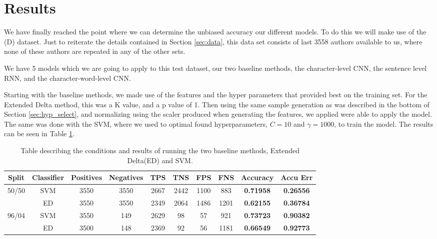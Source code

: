 \section{Results} \label{sec:results}

We have finally reached the point where we can determine the unbiased accuracy
our different models. To do this we will make use of the (D) dataset. Just
to reiterate the details contained in Section \ref{sec:data}, this data set
consists of last 3558 authors available to us, where none of these authors are
repeated in any of the other sets.

We have 5 models which we are going to apply to this test dataset,
our two baseline methods, the character-level \gls{CNN}, the sentence
level RNN, and the character-word-level \gls{CNN}.

Starting with the baseline methods, we made use of the features and the
hyper parameters that provided best on the training set.
For the Extended Delta method, this was a K value, and a p value of 1.
Then using the same sample generation as was described in the bottom
of Section \ref{sec:hyp_select}, and normalizing using the scaler
produced when generating the features, we applied were able to apply the model.
The same was done with the SVM, where we used to optimal found hyperparameters,
$C=10$ and $\gamma = 1000$, to train the model. The results can be seen in Table
\ref{tab:baseline-res}.

\begin{table}[h]
\centering
\begin{tabular}{|c|c|c|c|c|c|c|c||c|c|}
\hline
Split & Classifier & Positives & Negatives & TPS & TNS & FPS & FNS & \textbf{Accuracy} & \textbf{Accu Err} \\ \hline
\multirow{2}{*}{50/50} & SVM & 3550 & 3550 & 2667 & 2442 & 1100 & 883 & \textbf{0.71958} & \textbf{0.26556} \\ \cline{2-10} 
 & ED & 3550 & 3550 & 2349 & 2064 & 1486 & 1201 & \textbf{0.62155} & \textbf{0.36784} \\ \hline
\multirow{2}{*}{96/04} & SVM & 3550 & 149 & 2629 & 98 & 57 & 921 & \textbf{0.73723} & \textbf{0.90382} \\ \cline{2-10} 
 & ED & 3500 & 148 & 2369 & 92 & 56 & 1181 & \textbf{0.66549} & \textbf{0.92773} \\ \hline
\end{tabular}
\caption{Table describing the conditions and results of running the two baseline methods,
Extended Delta(ED) and SVM. }
\label{tab:baseline-res}
\end{table}

